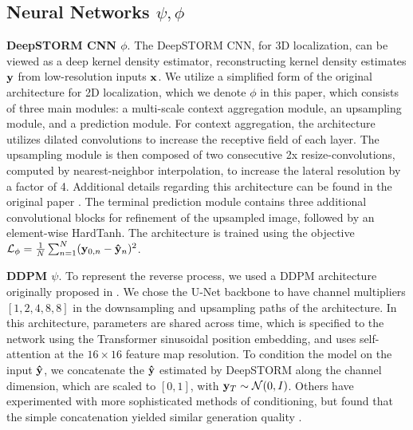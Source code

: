 \documentclass{article}
\begin{document}
\subsection{Neural Networks $\psi,\phi$}

\textbf{DeepSTORM CNN $\phi$}. The DeepSTORM CNN, for 3D localization, can be viewed as a deep kernel density estimator, reconstructing kernel density estimates $\bold{y}$ from low-resolution inputs $\bold{x}$. We utilize a simplified form of the original architecture \citep{Nehme2020} for 2D localization, which we denote $\phi$ in this paper, which consists of three main modules: a multi-scale context aggregation module, an upsampling module, and a prediction module. For context aggregation, the architecture utilizes dilated convolutions to increase the receptive field of each layer. The upsampling module is then composed of two consecutive 2x resize-convolutions, computed by nearest-neighbor interpolation, to increase the lateral resolution by a factor of 4. Additional details regarding this architecture can be found in the original paper \cite{Nehme2020}. The terminal prediction module contains three additional convolutional blocks for refinement of the upsampled image, followed by an element-wise HardTanh. The architecture is trained using the objective $\mathcal{L}_{\phi} = \frac{1}{N}\sum_{n=1}^{N} (\bold{y}_{0,n}-\bold{\hat{y}}_{n})^{2}$. 

\textbf{DDPM $\psi$}. To represent the reverse process, we used a DDPM architecture originally proposed in \citep{Saharia2021}. We chose the U-Net backbone to have channel multipliers $[1,2,4,8,8]$ in the downsampling and upsampling paths of the architecture. In this architecture, parameters are shared across time, which is specified to the network using the Transformer sinusoidal position embedding, and uses self-attention at the $16 \times 16$ feature map resolution. To condition the model on the input $\bold{\hat{y}}$, we concatenate the $\bold{\hat{y}}$ estimated by DeepSTORM along the channel dimension, which are scaled to $[0,1]$, with $\bold{y}_T\sim \mathcal{N}(0, I)$. Others have experimented with more sophisticated methods of conditioning, but found that the simple concatenation yielded similar generation quality \citep{Saharia2021}. 
\end{document}
